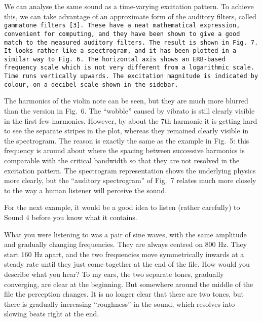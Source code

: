 
\audio{}

  We can analyse the same sound as a time-varying excitation pattern. To 
  achieve this, we can take advantage of an approximate form of the auditory 
  filters, called \tt{}gammatone filters\rm{} [3]. These have a neat 
  mathematical expression, convenient for computing, and they have been shown 
  to give a good match to the measured auditory filters. The result is shown in 
  Fig.\ 7. It looks rather like a spectrogram, and it has been plotted in a 
  similar way to Fig.\ 6. The horizontal axis shows an ERB-based frequency 
  scale which is not very different from a logarithmic scale. Time runs 
  vertically upwards. The excitation magnitude is indicated by colour, on a 
  decibel scale shown in the sidebar. 


  The harmonics of the violin note can be seen, but they are much more blurred 
  than the version in Fig.\ 6. The ``wobble'' caused by vibrato is still 
  clearly visible in the first few harmonics. However, by about the 7th 
  harmonic it is getting hard to see the separate stripes in the plot, whereas 
  they remained clearly visible in the spectrogram. The reason is exactly the 
  same as the example in Fig.\ 5: this frequency is around about where the 
  spacing between successive harmonics is comparable with the critical 
  bandwidth so that they are not resolved in the excitation pattern. The 
  spectrogram representation shows the underlying physics more clearly, but the 
  ``auditory spectrogram'' of Fig.\ 7 relates much more closely to the way a 
  human listener will perceive the sound. 

  For the next example, it would be a good idea to listen (rather carefully) to 
  Sound 4 before you know what it contains. 

\audio{}

  What you were listening to was a pair of sine waves, with the same amplitude 
  and gradually changing frequencies. They are always centred on 800 Hz. They 
  start 160 Hz apart, and the two frequencies move symmetrically inwards at a 
  steady rate until they just come together at the end of the file. How would 
  you describe what you hear? To my ears, the two separate tones, gradually 
  converging, are clear at the beginning. But somewhere around the middle of 
  the file the perception changes. It is no longer clear that there are two 
  tones, but there is gradually increasing ``roughness'' in the sound, which 
  resolves into slowing beats right at the end. 

